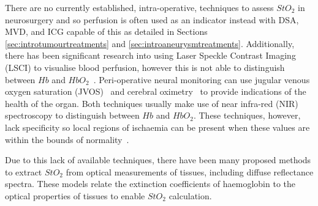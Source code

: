 There are no currently established, intra-operative, techniques to assess $StO_2$ in neurosurgery and so perfusion is often used as an indicator instead with DSA, MVD, and ICG capable of this as detailed in Sections \ref{sec:introtumourtreatments} and \ref{sec:introaneurysmtreatments}. Additionally, there has been significant research into using Laser Speckle Contrast Imaging (LSCI) to visualise blood perfusion, however this is not able to distinguish between $Hb$ and $HbO_2$~\citep{Dunn2012, Zhong2021}. Peri-operative neural monitoring can use jugular venous oxygen saturation (JVOS)~\citep{Raith2020} and cerebral oximetry~\citep{Lian2020} to provide indications of the health of the organ. Both techniques usually make use of near infra-red (NIR) spectroscopy to distinguish between $Hb$ and $HbO_2$. These techniques, however, lack specificity so local regions of ischaemia can be present when these values are within the bounds of normality~\citep{Raith2020, Zhong2021}.

Due to this lack of available techniques, there have been many proposed methods to extract $StO_2$ from optical measurements of tissues, including diffuse reflectance spectra. These models relate the extinction coefficients of haemoglobin to the optical properties of tissues to enable $StO_2$ calculation. 

